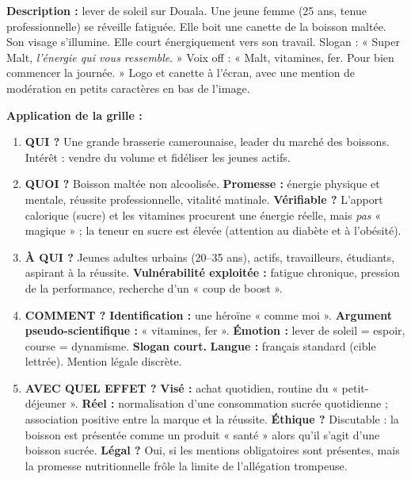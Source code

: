 \documentclass[11pt]{article}
\begin{document}
\begin{exoresolu}
\textbf{Description :} lever de soleil sur Douala. Une jeune femme (25 ans, tenue professionnelle) se réveille fatiguée. Elle boit une canette de la boisson maltée. Son visage s'illumine. Elle court énergiquement vers son travail. Slogan : « Super Malt, \emph{l'énergie qui vous ressemble}. » Voix off : « Malt, vitamines, fer. Pour bien commencer la journée. » Logo et canette à l'écran, avec une mention de modération en petits caractères en bas de l'image.

\medskip
\textbf{Application de la grille :}
\begin{enumerate}
    \item \textbf{QUI ?} Une grande brasserie camerounaise, leader du marché des boissons. Intérêt : vendre du volume et fidéliser les jeunes actifs.
    \item \textbf{QUOI ?} Boisson maltée non alcoolisée. \textbf{Promesse :} énergie physique et mentale, réussite professionnelle, vitalité matinale. \textbf{Vérifiable ?} L'apport calorique (sucre) et les vitamines procurent une énergie réelle, mais \emph{pas} « magique » ; la teneur en sucre est élevée (attention au diabète et à l'obésité).
    \item \textbf{À QUI ?} Jeunes adultes urbains (20–35 ans), actifs, travailleurs, étudiants, aspirant à la réussite. \textbf{Vulnérabilité exploitée :} fatigue chronique, pression de la performance, recherche d'un « coup de boost ».
    \item \textbf{COMMENT ?} \textbf{Identification :} une héroïne « comme moi ». \textbf{Argument pseudo-scientifique :} « vitamines, fer ». \textbf{Émotion :} lever de soleil = espoir, course = dynamisme. \textbf{Slogan court.} \textbf{Langue :} français standard (cible lettrée). Mention légale discrète.
    \item \textbf{AVEC QUEL EFFET ?} \textbf{Visé :} achat quotidien, routine du « petit-déjeuner ». \textbf{Réel :} normalisation d'une consommation sucrée quotidienne ; association positive entre la marque et la réussite. \textbf{Éthique ?} Discutable : la boisson est présentée comme un produit « santé » alors qu'il s'agit d'une boisson sucrée. \textbf{Légal ?} Oui, si les mentions obligatoires sont présentes, mais la promesse nutritionnelle frôle la limite de l'allégation trompeuse.
\end{enumerate}
\end{exoresolu}
\end{document}
